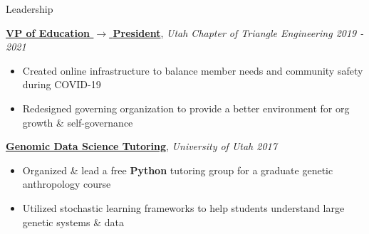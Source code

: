 \documentclass{resume/resume}
\begin{document}
\begin{rSection}{Leadership}
 
    \href{https://github.com/UtahTriangle/Laws}{\bf VP of Education $\rightarrow$ \bf President}, {\em Utah Chapter of Triangle Engineering \hfill 2019 - 2021}
    \vspace{-6pt}
    \begin{itemize}[nosep]
        \item Created online infrastructure to balance member needs and community safety during COVID-19
        \item Redesigned governing organization to provide a better environment for org growth \& self-governance
        
    \end{itemize}

    

    \href{http://content.csbs.utah.edu/~rogers/ant5221/lab/manual.pdf}{\bf Genomic Data Science Tutoring}, {\em University of Utah \hfill 2017}
    \vspace{-6pt}
    \begin{itemize}[nosep]
      \item Organized \& lead a free {\bf Python} tutoring group for a graduate genetic anthropology course
      \item Utilized stochastic learning frameworks to help students understand large genetic systems \& data
    \end{itemize}


\end{rSection}
\end{document}
